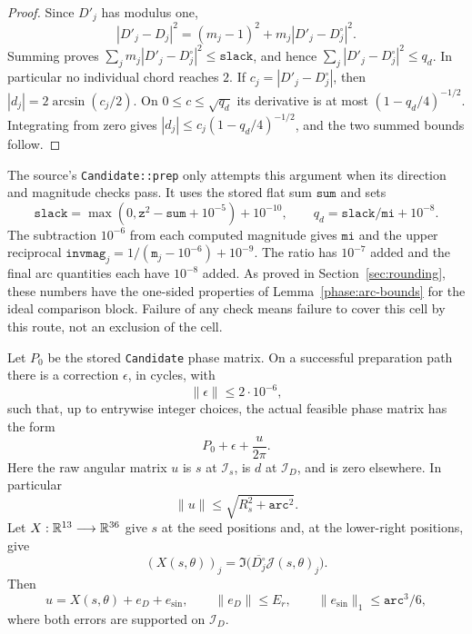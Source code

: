 \begin{proof}
Since \(D'_j\) has modulus one,
\begin{equation}
 |D'_j-D_j|^2=(m_j-1)^2+
                         m_j|D'_j-D_j^\circ|^2.
 \label{phase:chord-identity}
\end{equation}
Summing proves
\(\sum_jm_j|D'_j-D_j^\circ|^2\leq\mathtt{slack}\), and hence
\(\sum_j|D'_j-D_j^\circ|^2\leq q_d\).  In particular no individual
chord reaches \(2\).  If \(c_j=|D'_j-D_j^\circ|\), then
\(|d_j|=2\arcsin(c_j/2)\).  On \(0\leq c\leq\sqrt{q_d}\) its
derivative is at most \((1-q_d/4)^{-1/2}\).  Integrating from zero
gives
\(|d_j|\leq c_j(1-q_d/4)^{-1/2}\), and the two summed bounds follow.
\end{proof}

The source's \texttt{Candidate::prep} only attempts this argument when
its direction and magnitude checks pass.  It uses the stored flat
sum \(\mathtt{sum}\) and sets
\[
 \mathtt{slack}
   =\max(0,\mathtt z^2-\mathtt{sum}+10^{-5})+10^{-10},
 \qquad
 q_d=\mathtt{slack}/\mathtt{mi}+10^{-8}.
\]
The subtraction \(10^{-6}\) from each computed magnitude gives
\(\mathtt{mi}\) and the upper reciprocal
\(\mathtt{invmag}_j=1/(\mathtt m_j-10^{-6})+10^{-9}\).
The ratio has \(10^{-7}\) added and the final arc quantities each have
\(10^{-8}\) added.  As proved in Section~\ref{sec:rounding}, these
numbers have the one-sided properties of Lemma~\ref{phase:arc-bounds}
for the ideal comparison block.  Failure of any check means failure
to cover this cell by this route, not an exclusion of the cell.

\begin{lemma}
\label{phase:center-correction}
Let \(P_0\) be the stored \texttt{Candidate} phase matrix.  On a
successful preparation path there is a correction \(\epsilon\), in
cycles, with
\begin{equation}
 \|\epsilon\|\leq2\cdot10^{-6},
 \label{phase:epsilon}
\end{equation}
such that, up to entrywise integer choices, the actual feasible phase
matrix has the form
\begin{equation}
 P_0+\epsilon+\frac{u}{2\pi}.
 \label{phase:candidate-lift}
\end{equation}
Here the raw angular matrix \(u\) is \(s\) at \(\mathcal I_s\), is
\(d\) at \(\mathcal I_D\), and is zero elsewhere.  In particular
\begin{equation}
 \|u\|\leq\sqrt{R_s^2+\mathtt{arc}^2}.
 \label{phase:raw-displacement}
\end{equation}
Let \(X:\mathbb R^{13}\longrightarrow\mathbb R^{36}\) give \(s\) at the seed
positions and, at the lower-right positions, give
\begin{equation}
 (X(s,\theta))_j
       =\Im\bigl(\overline{D_j^\circ}\mathcal J(s,\theta)_j\bigr).
 \label{phase:X}
\end{equation}
Then
\begin{equation}
 u=X(s,\theta)+e_D+e_{\sin},\qquad
 \|e_D\|\leq E_r,\qquad
 \|e_{\sin}\|_1\leq\mathtt{arc}^3/6,
 \label{phase:raw-support}
\end{equation}
where both errors are supported on \(\mathcal I_D\).
\end{lemma}

